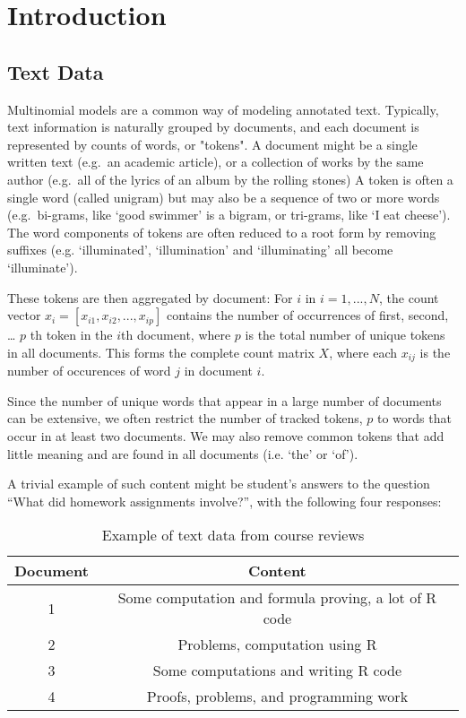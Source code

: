 \documentclass[12pt]{article}
\begin{document}
\newpage


\section{Introduction}

\subsection{Text Data}




Multinomial models are a common way of modeling annotated text.
Typically, text information is naturally grouped by documents, and each
document is represented by counts of words, or "tokens". A document might be a
single written text (e.g.~an academic article), or a collection of works
by the same author (e.g.~all of the lyrics of an album by the rolling
stones) A token is often a single word (called unigram) but may also be
a sequence of two or more words (e.g.~bi-grams, like `good swimmer' is a
bigram, or tri-grams, like `I eat cheese'). The word components of
tokens are often reduced to a root form by removing suffixes (e.g.
`illuminated', `illumination' and `illuminating' all become
`illuminate').

These tokens are then aggregated by document: For $i$ in $i = 1,...,N$,
the count vector $x_i = [x_{i1}, x_{i2}, ... , x_{ip}]$ contains the
number of occurrences of first, second, \ldots{} $p$ th token in the
$i$th document, where $p$ is the total number of unique tokens in all
documents. This forms the complete count matrix $X$, where each $x_{ij}$
is the number of occurences of word $j$ in document $i$.

Since the number of unique words that appear in a large number of
documents can be extensive, we often restrict the number of tracked
tokens, $p$ to words that occur in at least two documents. We may also
remove common tokens that add little meaning and are found in all
documents (i.e. `the' or `of').

A trivial example of such content might be student's answers to the
question ``What did homework assignments involve?'', with the following four responses:

\begin{table}[!hbpt]
\caption{Example of text data from course reviews} \label{tab:title}
\begin{center}
\begin{tabular} {c c}
\textbf{Document} & \textbf{Content} \\
\hline
1 & Some computation and formula proving, a lot of R code \\
2 & Problems, computation using R \\
3 & Some computations and writing R code\\
4 & Proofs, problems, and programming work \\
\end{tabular}
\end{center}
\end{table}
\end{document}
